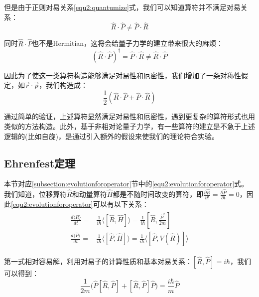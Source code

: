     但是由于正则对易关系\eqref{equ2:quantumize}式，我们可以知道算符并不满足对易关系：
    \begin{equation}
        \hat{R}\cdot\hat{P}\ne \hat{P}\cdot\hat{R}
    \end{equation}
    
    同时$\hat{R}\cdot\hat{P}$也不是Hermitian，这将会给量子力学的建立带来很大的麻烦：
    \begin{equation}
        (\hat{R}\cdot\hat{P})^\dagger=\hat{P}\cdot\hat{R}\ne\hat{R}\cdot\hat{P}
    \end{equation}
    
     因此为了使这一类算符构造能够满足对易性和厄密性，我们增加了一条对称性假定，如$\Vec{r}\cdot\Vec{p}$，我们构造成：
     \begin{equation}
         \frac{1}{2}(\hat{R}\cdot\hat{P}+\hat{P}\cdot\hat{R})
     \end{equation}
     
     通过简单的验证，上述算符显然满足对易性和厄密性，遇到更复杂的算符形式也用类似的方法构造。此外，基于非相对论量子力学，有一些算符的建立是不急于上述逻辑的(比如自旋)，是通过引入额外的假设来使我们的理论符合实验。
    \subsection{Ehrenfest定理}
    本节对应\eqref{subsection:evolutionforoperator}节中的\eqref{equ2:evolutionforoperator}式。我们知道，位移算符$\hat{R}$和动量算符$\hat{H}$都是不随时间改变的算符，即$\frac{\partial\hat{R}}{\partial t}=\frac{\partial\hat{P}}{\partial t}=0$，因此\eqref{equ2:evolutionforoperator}可以有以下关系：
    \begin{align}
        \begin{split}
            \frac{d\langle \hat{R}\rangle}{dt}=&\frac{1}{i\hbar}\langle[\hat{R},\hat{H}]\rangle=\frac{1}{i\hbar}[\hat{R},\frac{\hat{P}^2}{2m}]\\
            \frac{d\langle \hat{P}\rangle}{dt}=& \frac{1}{i\hbar}\langle[\hat{P},\hat{H}]\rangle=\frac{1}{i\hbar}\langle[\hat{P},V(\hat{R})]\rangle
        \end{split}
    \end{align}
    
    第一式相对容易解，利用对易子的计算性质和基本对易关系：$[\hat{R},\hat{P}]=i\hbar$，我们可以得到：
    \begin{equation}
        [\hat{R},\frac{\hat{P}^2}{2m}]\frac{1}{2m}\Big(\hat{P}[\hat{R},\hat{P}]+[\hat{R},\hat{P}]\hat{P}\Big)=\frac{i\hbar}{m}\hat{P}
    \end{equation}
    
